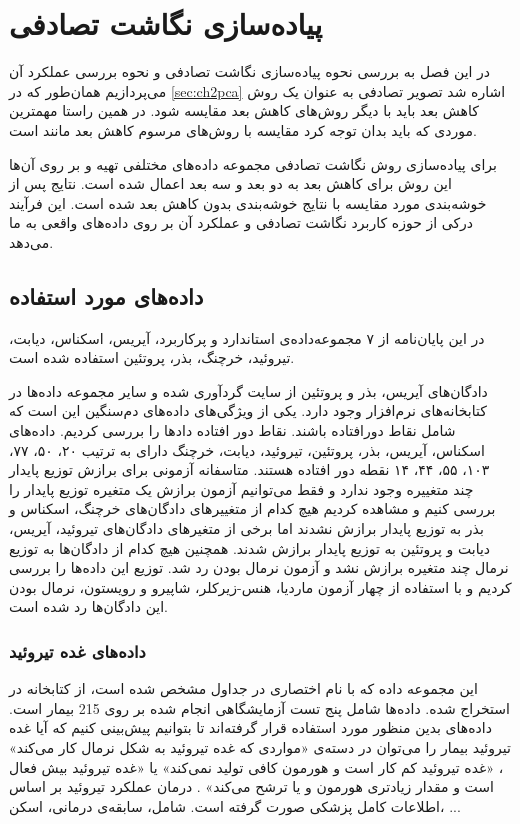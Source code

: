 \chapter{
پیاده‌سازی نگاشت تصادفی
}

در این فصل به بررسی نحوه پیاده‌سازی نگاشت تصادفی و نحوه بررسی عملکرد آن می‌پردازیم همان‌طور که در  
\autoref{sec:ch2pca}
اشاره شد تصویر تصادفی به عنوان یک روش کاهش بعد باید با دیگر روش‌های کاهش بعد مقایسه شود. در همین راستا مهمترین موردی که باید بدان توجه کرد مقایسه با روش‌های مرسوم کاهش بعد مانند
است.

برای پیاده‌سازی روش نگاشت تصادفی مجموعه داده‌های مختلفی تهیه‌ و بر روی آن‌ها این روش برای کاهش بعد به دو بعد و سه بعد اعمال شده است. نتایج پس از خوشه‌بندی مورد مقایسه با نتایج خوشه‌بندی بدون کاهش بعد شده است. این فرآیند درکی از حوزه کاربرد نگاشت تصادفی و عملکرد آن بر روی داده‌های واقعی به ما می‌دهد.


\section{
داده‌های مورد استفاده
}

در این پایان‌نامه از ۷ مجموعه‌داده‌ی استاندارد و پرکاربرد، آیریس، اسکناس، دیابت، تیروئید، خرچنگ، بذر، پروتئین استفاده شده است.

دادگا‌ن‌های آیریس، بذر و پروتئین از سایت 
گردآوری شده و سایر مجموعه داده‌ها در کتابخانه‌های نرم‌افزار 
وجود دارد. یکی از ویژگی‌های داده‌های دم‌سنگین این است که شامل نقاط دورافتاده باشند. نقاط دور افتاده داد‌ها را بررسی کردیم. داده‌های اسکناس، آیریس، بذر، پروتئین، تیروئید، دیابت، خرچنگ دارای به ترتیب ۲۰، ۵۰، ۷۷، ۱۰۳، ۵۵، ۴۴، ۱۴ نقطه دور افتاده هستند. متاسفانه آزمونی برای برازش توزیع پایدار چند متغییره وجود ندارد و فقط می‌توانیم آزمون برازش یک متغیره توزیع پایدار را بررسی کنیم و مشاهده کردیم هیچ کدام از متغییر‌های دادگان‌های خرچنگ، اسکناس و بذر به توزیع پایدار برازش نشدند اما برخی از متغیرهای دادگان‌های تیروئید، آیریس، دیابت و پروتئین به توزیع پایدار برازش شدند. همچنین هیچ کدام از دادگان‌ها به توزیع نرمال چند متغیره برازش نشد و آزمون نرمال بودن رد شد. توزیع این داده‌ها را بررسی کردیم و با استفاده از چهار آزمون ماردیا، هنس-زیرکلر، شاپیرو و رویستون، نرمال بودن این دادگان‌ها رد شده است.%
\cite{spisheh2018}


\subsection{
داده‌های غده تیروئید
}

این مجموعه داده که با نام اختصاری 
در جداول مشخص شده است، از کتابخانه
\cite{rmclust}
در 
استخراج شده. داده‌ها شامل پنج تست آزمایشگاهی انجام شده بر روی 215 بیمار است. داده‌های بدین منظور مورد استفاده قرار گرفته‌اند تا بتوانیم پیش‌بینی کنیم که آیا غده تیروئید بیمار را می‌توان در دسته‌ی «مواردی که غده تیروئید به شکل نرمال کار می‌کند»
، «غده تیروئید کم کار است و هورمون کافی تولید نمی‌کند»
یا «غده تیروئید بیش فعال است و مقدار زیادتری هورمون 
و یا
ترشح می‌کند»
. درمان عملکرد تیروئید بر اساس اطلاعات کامل پزشکی صورت گرفته است. شامل، سابقه‌ی درمانی، اسکن، ...

